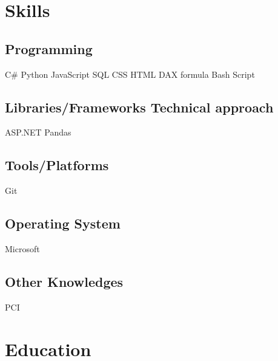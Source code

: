 \documentclass[]{plushcv}
\begin{document}
\hfill
\begin{minipage}[t]{0.25\textwidth} 


\section{Skills}
\subsection{Programming}
\sectionsep
C\# \textbullet{} Python \textbullet{} JavaScript \textbullet{}  SQL \textbullet{} CSS \textbullet{} HTML \textbullet{} DAX formula \textbullet{} Bash Script
\sectionsep
\subsection{Libraries/Frameworks Technical approach}
\sectionsep
ASP.NET                   Pandas   
\sectionsep
\subsection{Tools/Platforms}
\sectionsep
Git     
\sectionsep
\subsection{Operating System}
Microsoft 
\sectionsep
\subsection{Other Knowledges}
PCI  
\sectionsep


\section{Education} 

\end{minipage}
\end{document}
